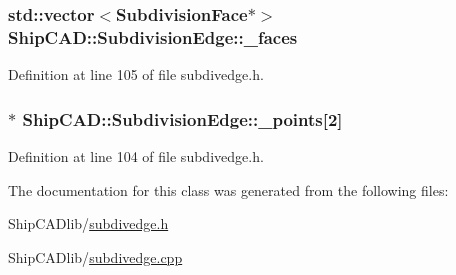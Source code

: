 \subsubsection[{\texorpdfstring{\+\_\+faces}{_faces}}]{\setlength{\rightskip}{0pt plus 5cm}std\+::vector$<${\bf Subdivision\+Face}$\ast$$>$ Ship\+C\+A\+D\+::\+Subdivision\+Edge\+::\+\_\+faces\hspace{0.3cm}{\ttfamily [protected]}}\hypertarget{classShipCAD_1_1SubdivisionEdge_aa1da730fcb3ac49c92e803a0b336d855}{}\label{classShipCAD_1_1SubdivisionEdge_aa1da730fcb3ac49c92e803a0b336d855}


Definition at line 105 of file subdivedge.\+h.

\subsubsection[{\texorpdfstring{\+\_\+points}{_points}}]{$\ast$ Ship\+C\+A\+D\+::\+Subdivision\+Edge\+::\+\_\+points\mbox{[}2\mbox{]}\hspace{0.3cm}{\ttfamily [protected]}}\hypertarget{classShipCAD_1_1SubdivisionEdge_a55519f9d615d6bd701c10c48259525ac}{}\label{classShipCAD_1_1SubdivisionEdge_a55519f9d615d6bd701c10c48259525ac}


Definition at line 104 of file subdivedge.\+h.



The documentation for this class was generated from the following files\+:\begin{DoxyCompactItemize}
\item 
Ship\+C\+A\+Dlib/\hyperlink{subdivedge_8h}{subdivedge.\+h}\item 
Ship\+C\+A\+Dlib/\hyperlink{subdivedge_8cpp}{subdivedge.\+cpp}\end{DoxyCompactItemize}
